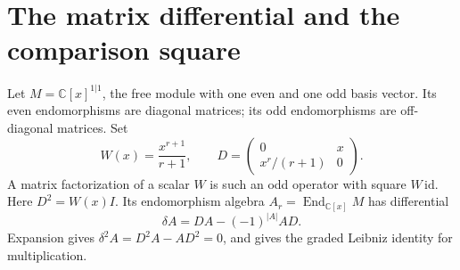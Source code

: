 \section{The matrix differential and the comparison square}
\label{sec:sc050-matrix}

Let \(M=\mathbb C[x]^{1|1}\), the free module with one even and
one odd basis vector. Its even endomorphisms are diagonal matrices;
its odd endomorphisms are off-diagonal matrices. Set
\[
 W(x)=\frac{x^{r+1}}{r+1},\qquad
 D=\begin{pmatrix}0&x\\x^r/(r+1)&0\end{pmatrix}.
\]
A matrix factorization of a scalar \(W\) is such an odd operator
with square \(W\,\mathrm{id}\). Here \(D^2=W(x)I\).
Its endomorphism algebra \(A_r=\operatorname{End}_{\mathbb C[x]}M\)
has differential
\[
 \delta A=DA-(-1)^{|A|}AD.
\]
Expansion gives \(\delta^2A=D^2A-AD^2=0\), and gives the graded
Leibniz identity for multiplication.

